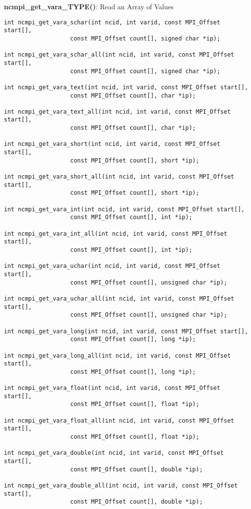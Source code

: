 {\bf ncmpi\_get\_vara\_TYPE()}: Read an Array of Values

\begin{verbatim}
int ncmpi_get_vara_schar(int ncid, int varid, const MPI_Offset start[],
                   const MPI_Offset count[], signed char *ip);

int ncmpi_get_vara_schar_all(int ncid, int varid, const MPI_Offset start[],
                   const MPI_Offset count[], signed char *ip);

int ncmpi_get_vara_text(int ncid, int varid, const MPI_Offset start[],
                   const MPI_Offset count[], char *ip); 

int ncmpi_get_vara_text_all(int ncid, int varid, const MPI_Offset start[],
                   const MPI_Offset count[], char *ip); 

int ncmpi_get_vara_short(int ncid, int varid, const MPI_Offset start[],
                   const MPI_Offset count[], short *ip); 

int ncmpi_get_vara_short_all(int ncid, int varid, const MPI_Offset start[],
                   const MPI_Offset count[], short *ip); 

int ncmpi_get_vara_int(int ncid, int varid, const MPI_Offset start[],
                   const MPI_Offset count[], int *ip); 

int ncmpi_get_vara_int_all(int ncid, int varid, const MPI_Offset start[],
                   const MPI_Offset count[], int *ip); 

int ncmpi_get_vara_uchar(int ncid, int varid, const MPI_Offset start[],
                   const MPI_Offset count[], unsigned char *ip);

int ncmpi_get_vara_uchar_all(int ncid, int varid, const MPI_Offset start[],
                   const MPI_Offset count[], unsigned char *ip); 

int ncmpi_get_vara_long(int ncid, int varid, const MPI_Offset start[],
                   const MPI_Offset count[], long *ip);

int ncmpi_get_vara_long_all(int ncid, int varid, const MPI_Offset start[],
                   const MPI_Offset count[], long *ip); 

int ncmpi_get_vara_float(int ncid, int varid, const MPI_Offset start[],
                   const MPI_Offset count[], float *ip); 

int ncmpi_get_vara_float_all(int ncid, int varid, const MPI_Offset start[],
                   const MPI_Offset count[], float *ip);

int ncmpi_get_vara_double(int ncid, int varid, const MPI_Offset start[],
                   const MPI_Offset count[], double *ip);

int ncmpi_get_vara_double_all(int ncid, int varid, const MPI_Offset start[],
                   const MPI_Offset count[], double *ip); 
\end{verbatim}


